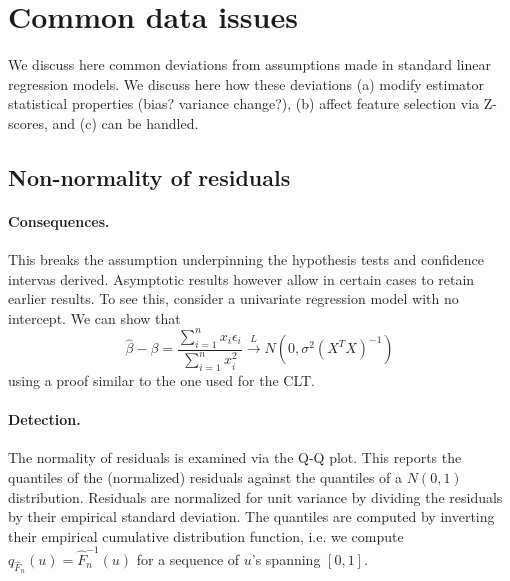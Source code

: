 \documentclass[]{article}
\begin{document}
\section{Common data issues}

We discuss here common deviations from assumptions made in standard linear regression models. We discuss here how these deviations (a) modify estimator statistical properties (bias? variance change?), (b) affect feature selection via Z-scores, and (c) can be handled.

\subsection{Non-normality of residuals}

\paragraph{Consequences.} This breaks the assumption underpinning the hypothesis tests and confidence intervas derived. Asymptotic results however allow in certain cases to retain earlier results. To see this, consider a univariate regression model with no intercept. We can show that
\begin{equation}
\hat{\beta}-\beta=\frac{\sum_{i=1}^n x_i \epsilon_i}{\sum_{i=1}^n x_i^2}\xrightarrow{L}N\left(0, \sigma^2(X^TX)^{-1}\right)
\end{equation}
using a proof similar to the one used for the CLT.

\paragraph{Detection.} The normality of residuals is examined via the Q-Q plot. This reports the quantiles of the (normalized) residuals against the quantiles of a $N(0,1)$ distribution. Residuals are normalized for unit variance by dividing the residuals by their empirical standard deviation. The quantiles are computed by inverting their empirical cumulative distribution function, i.e. we compute $q_{\hat{F}_n}(u)=\hat{F}_n^{-1}(u)$ for a sequence of $u$'s spanning $[0,1]$.
\end{document}

